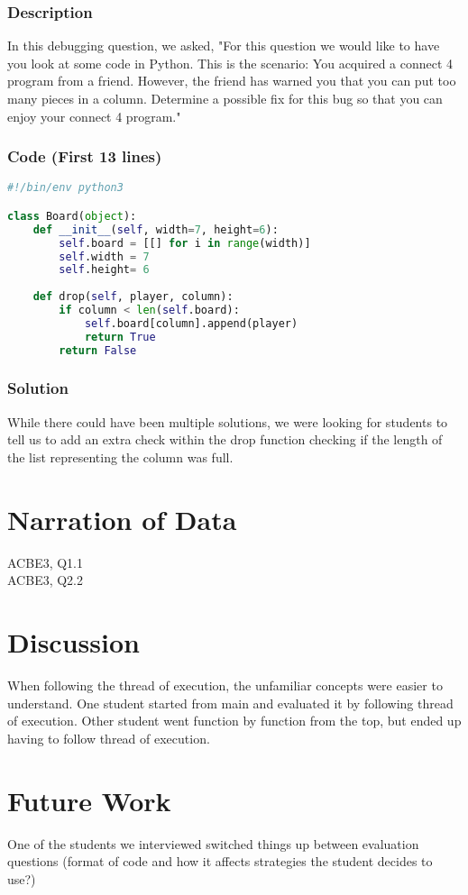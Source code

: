 \documentclass{article}
\begin{document}
\subsubsection{Description}
In this debugging question, we asked, "For this question we would like to have you look at some code in Python. This is the scenario: You acquired a connect 4 program from a friend. However, the friend has warned you that you can put too many pieces in a column. Determine a possible fix for this bug so that you can enjoy your connect 4 program."
\subsubsection{Code (First 13 lines)}
\begin{lstlisting}[language=python]
#!/bin/env python3

class Board(object):
	def __init__(self, width=7, height=6):
		self.board = [[] for i in range(width)]
		self.width = 7
		self.height= 6
	
	def drop(self, player, column):
		if column < len(self.board):
			self.board[column].append(player)
			return True
		return False
\end{lstlisting}
\subsubsection{Solution}
While there could have been multiple solutions, we were looking for students to tell us to add an extra check within the drop function checking if the length of the list representing the column was full.

\section{Narration of Data}
ACBE3, Q1.1 \\
ACBE3, Q2.2 

\section{Discussion}
When following the thread of execution, the unfamiliar concepts were easier to understand. 
One student started from main and evaluated it by following thread of execution. Other student went function by function from the top, but ended up having to follow thread of execution. 

\section{Future Work}
One of the students we interviewed switched things up between evaluation questions (format of code and how it affects strategies the student decides to use?)
\end{document}
